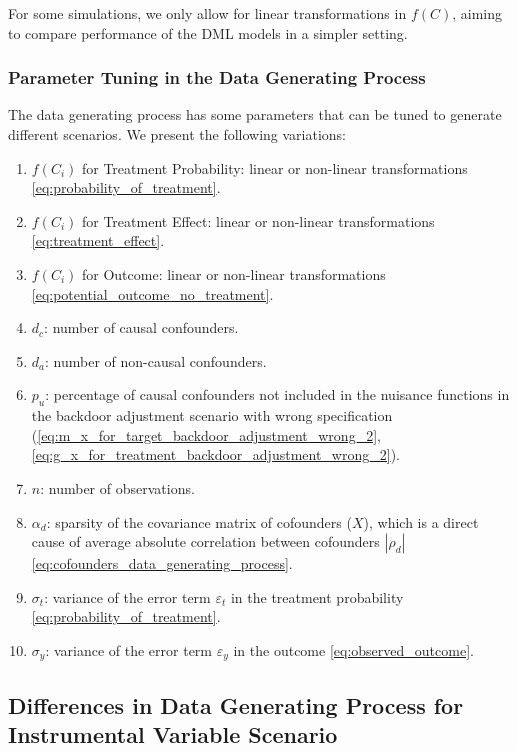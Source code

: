 \documentclass{article}
\numberwithin{equation}{section}
\begin{document}
For some simulations, we only allow for linear transformations in $f(C)$, aiming to compare performance of the DML models in a simpler setting.

\subsubsection{Parameter Tuning in the Data Generating Process}

The data generating process has some parameters that can be tuned to generate different scenarios. We present the following variations:

\begin{enumerate}[label=\roman*.]
    \item $f(C_i)$ for Treatment Probability: linear or non-linear transformations \eqref{eq:probability_of_treatment}.
    \item $f(C_i)$ for Treatment Effect: linear or non-linear transformations \eqref{eq:treatment_effect}.
    \item $f(C_i)$ for Outcome: linear or non-linear transformations \eqref{eq:potential_outcome_no_treatment}.
    \item $d_c$: number of causal confounders.
    \item $d_a$: number of non-causal confounders.
    \item $p_u$: percentage of causal confounders not included in the nuisance functions in the backdoor adjustment scenario with wrong specification (\ref{eq:m_x_for_target_backdoor_adjustment_wrong_2}, \ref{eq:g_x_for_treatment_backdoor_adjustment_wrong_2}).
    \item $n$: number of observations.
    \item $\alpha_d$: sparsity of the covariance matrix of cofounders ($X$), which is a direct cause of average absolute correlation between cofounders ${|\rho_d|}$ \eqref{eq:cofounders_data_generating_process}.
    \item $\sigma_t$: variance of the error term $\varepsilon_t$ in the treatment probability \eqref{eq:probability_of_treatment}.
    \item $\sigma_y$: variance of the error term $\varepsilon_y$ in the outcome \eqref{eq:observed_outcome}.
\end{enumerate}

\subsection{Differences in Data Generating Process for Instrumental Variable Scenario}
\label{subsec:differences_in_data_generating_process_for_instrumental_variable_scenario}
\end{document}
